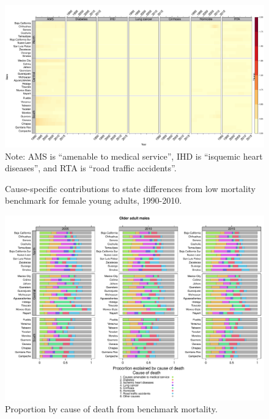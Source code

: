 \documentclass[11.5pt]{article}
\begin{document}
{\begin{figure}
\centering
\caption{Cause-specific contributions to state differences from low mortality benchmark for female young adults, 1990-2010.}
\label{fig:e15_39_females}
\includegraphics[scale=.3]{YoungAdult_Female_heatmap.pdf}
Note: AMS is ``amenable to medical service'', IHD is ``isquemic heart diseases'', and RTA is ``road traffic accidents''.
\end{figure}

\begin{figure}
\centering
\caption{Proportion by cause of death from benchmark mortality.}
\begin{center}
\includegraphics[scale=.45]{Figure_prop_oam.pdf}
\end{center}
\end{figure}


}
\end{document}
